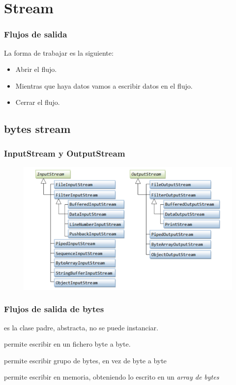 \documentclass{beamer}
\begin{document}
\section{Stream}
\begin{frame}[fragile]
\frametitle{Flujos de salida}
La forma de trabajar es la siguiente:
\begin{itemize}[<+->]
\item Abrir el flujo.
\item Mientras que haya datos vamos a escribir datos en el flujo.
\item Cerrar el flujo.
\end{itemize}
\end{frame}



\subsection{bytes stream}
\begin{frame}
\frametitle{InputStream y OutputStream}
\begin{figure}
\includegraphics[scale=0.6]{imagenes/io.png}
\end{figure}
\end{frame}

\begin{frame}[fragile]
\frametitle{Flujos de salida de bytes}
\begin{description}[<+->]
\item[OutputStream] es la clase padre, abstracta, no se puede instanciar.
\item[FileOutputStream] permite escribir en un fichero byte a byte.
\item[BufferedOutputStream] permite escribir grupo de bytes, en vez de byte a byte
\item[ByteArrayOutputStream] permite escribir en memoria, obteniendo lo escrito en un \emph{array de bytes}
\pause
\end{description}
\end{frame}
\end{document}
